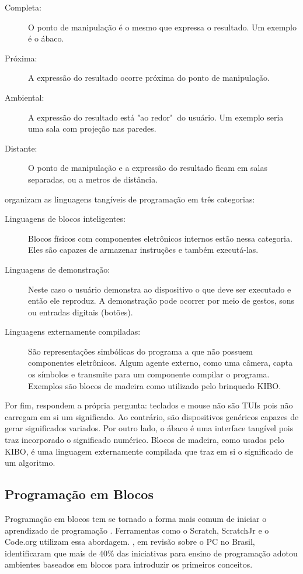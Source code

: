 \begin{description}
    \item[Completa:] O ponto de manipulação é o mesmo que expressa o resultado. Um exemplo é o ábaco.
    \item[Próxima:] A expressão do resultado ocorre próxima do ponto de manipulação.
    \item[Ambiental:] A expressão do resultado está "ao redor"\ do usuário. Um exemplo seria uma sala com projeção nas paredes.
    \item[Distante:] O ponto de manipulação e a expressão do resultado ficam em salas separadas, ou a metros de distância.
\end{description}

 organizam as linguagens tangíveis de programação em três categorias:

\begin{description}
    \item[Linguagens de blocos inteligentes:] Blocos físicos com componentes eletrônicos internos estão nessa categoria. Eles são capazes de armazenar instruções e também executá-las.
    
    \item[Linguagens de demonstração:] Neste caso o usuário demonstra ao dispositivo o que deve ser executado e então ele reproduz. A demonstração pode ocorrer por meio de gestos, sons ou entradas digitais (botões).
    
    \item[Linguagens externamente compiladas:] São representações simbólicas do programa a que não possuem componentes eletrônicos. Algum agente externo, como uma câmera, capta os símbolos e transmite para um componente compilar o programa. Exemplos são blocos de madeira como utilizado pelo brinquedo KIBO.
\end{description}

Por fim,  respondem a própria pergunta: teclados e mouse não são TUIs pois não carregam em si um significado. Ao contrário, são dispositivos genéricos capazes de gerar significados variados. Por outro lado, o ábaco é uma interface tangível pois traz incorporado o significado numérico. Blocos de madeira, como usados pelo KIBO, é uma linguagem externamente compilada que traz em si o significado de um algoritmo.

\subsection{Programação em Blocos}
\label{sec_prog_blocos}
Programação em blocos tem se tornado a forma mais comum de iniciar o aprendizado de programação \cite{weintrop_block-based_2019}. Ferramentas como o Scratch, ScratchJr e o Code.org utilizam essa abordagem. , em revisão sobre o \acl{PC} no Brasil, identificaram que mais de 40\% das iniciativas para ensino de programação adotou ambientes baseados em blocos para introduzir os primeiros conceitos. 

